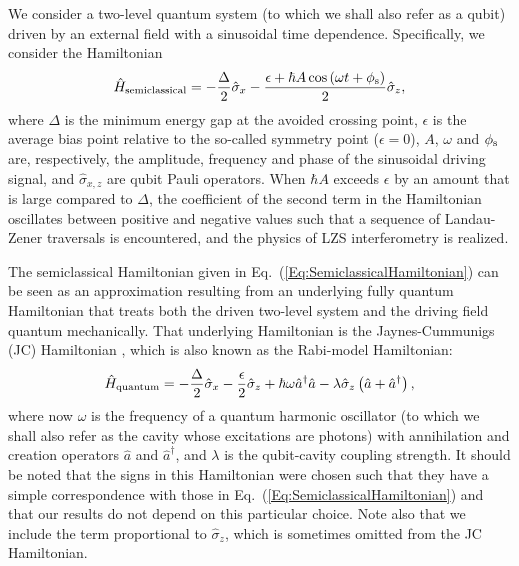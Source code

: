 \documentclass[aps,twocolumn,superscriptaddress]{revtex4}
\begin{document}
We consider a two-level quantum system  (to which we shall also refer as a qubit) driven by an external field with a sinusoidal time dependence. Specifically, we consider the Hamiltonian
%
\begin{equation}
\hat{H}_{\rm semiclassical} = -\frac{\Delta}{2} \hat{\sigma}_{x}-\frac{\epsilon+\hbar A\cos\left(\omega t+\phi_{\rm s}\right)}{2} \hat{\sigma}_{z},
%
\label{Eq:SemiclassicalHamiltonian}
\end{equation}
%
where $\Delta$ is the minimum energy gap at the avoided crossing point, $\epsilon$ is the average bias point relative to the so-called symmetry point ($\epsilon=0$), $A$, $\omega$ and $\phi_{\rm s}$ are, respectively, the amplitude, frequency and phase of the sinusoidal driving signal, and $\hat{\sigma}_{x,z}$ are qubit Pauli operators. When $\hbar A$ exceeds $\epsilon$ by an amount that is large compared to $\Delta$, the coefficient of the second term in the Hamiltonian oscillates between positive and negative values such that a sequence of Landau-Zener traversals is encountered, and the physics of LZS interferometry is realized.

The semiclassical Hamiltonian given in Eq.~(\ref{Eq:SemiclassicalHamiltonian}) can be seen as an approximation resulting from an underlying fully quantum Hamiltonian that treats both the driven two-level system and the driving field quantum mechanically. That underlying Hamiltonian is the Jaynes-Cummunigs (JC) Hamiltonian \cite{Jaynes}, which is also known as the Rabi-model Hamiltonian:
%
\begin{equation}
\hat{H}_{\rm quantum} = -\frac{\Delta}{2} \hat{\sigma}_x-\frac{\epsilon}{2} \hat{\sigma}_z+\hbar\omega \hat{a}^{\dagger}\hat{a}- \lambda \hat{\sigma}_z \left( \hat{a} + \hat{a}^{\dagger} \right),
%
\label{Eq:QuantumHamiltonian}
\end{equation}
%
where now $\omega$ is the frequency of a quantum harmonic oscillator (to which we shall also refer as the cavity whose excitations are photons) with annihilation and creation operators $\hat{a}$ and $\hat{a}^{\dagger}$, and $\lambda$ is the qubit-cavity coupling strength. It should be noted that the signs in this Hamiltonian were chosen such that they have a simple correspondence with those in Eq.~(\ref{Eq:SemiclassicalHamiltonian}) and that our results do not depend on this particular choice. Note also that we include the term proportional to $\hat{\sigma}_z$, which is sometimes omitted from the JC Hamiltonian.
\end{document}
